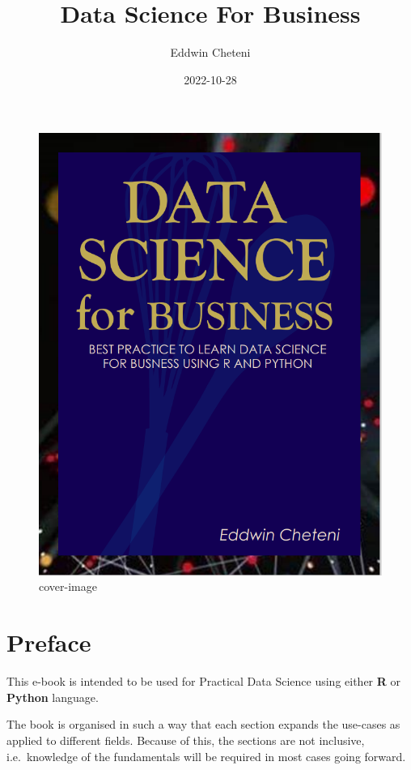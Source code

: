 \documentclass[
]{book}
\title{Data Science For Business}
\author{Eddwin Cheteni}
\date{2022-10-28}
\begin{document}
\maketitle

{
\setcounter{tocdepth}{1}
\tableofcontents
}
\begin{figure}
\centering
\includegraphics{images/ds4business.png}
\caption{cover-image}
\end{figure}

\hypertarget{preface}{%
\chapter{Preface}\label{preface}}

This e-book is intended to be used for Practical Data Science using either \textbf{R} or \textbf{Python} language.

The book is organised in such a way that each section expands the use-cases as applied to different fields. Because of this, the sections are not inclusive, i.e.~knowledge of the fundamentals will be required in most cases going forward.
\end{document}
